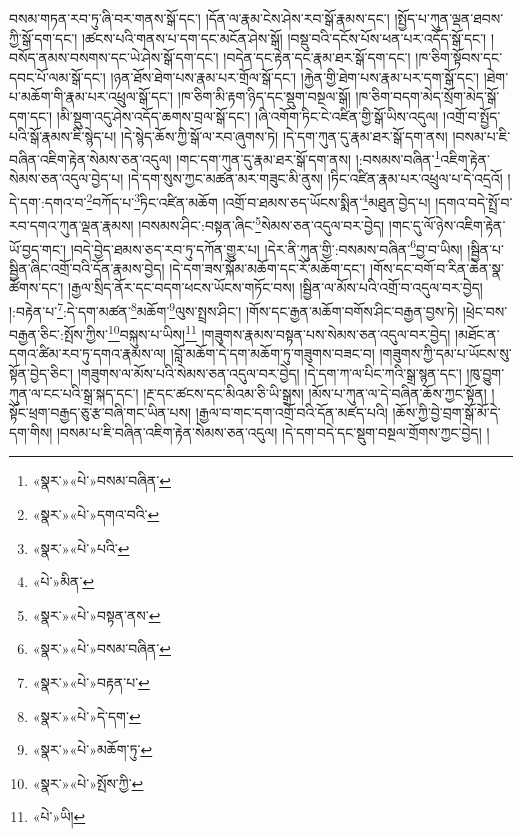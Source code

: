 བསམ་གཏན་རབ་ཏུ་ཞི་བར་གནས་སྒོ་དང་། །དོན་ལ་རྣམ་ངེས་ཤེས་རབ་སྒོ་རྣམས་དང་། །སྤྱོད་པ་ཀུན་ལྡན་ཐབས་ཀྱི་སྒོ་དག་དང་། །ཚངས་པའི་གནས་པ་དག་དང་མངོན་ཤེས་སྒོ། །བསྡུ་བའི་དངོས་པོས་ཕན་པར་འདོད་སྒོ་དང་། །བསོད་ནམས་བསགས་དང་ཡེ་ཤེས་སྒོ་དག་དང་། །བདེན་དང་རྟེན་དང་རྣམ་ཐར་སྒོ་དག་དང་། །ཁ་ཅིག་སྟོབས་དང་དབང་པོ་ལམ་སྒོ་དང་། །ཉན་ཐོས་ཐེག་པས་རྣམ་པར་གྲོལ་སྒོ་དང་། །རྐྱེན་གྱི་ཐེག་པས་རྣམ་པར་དག་སྒོ་དང་། །ཐེག་པ་མཆོག་གི་རྣམ་པར་འཕྲུལ་སྒོ་དང་། །ཁ་ཅིག་མི་རྟག་ཉིད་དང་སྡུག་བསྔལ་སྒོ། །ཁ་ཅིག་བདག་མེད་སྲོག་མེད་སྒོ་དག་དང་། །མི་སྡུག་འདུ་ཤེས་འདོད་ཆགས་བྲལ་སྒོ་དང་། །ཞི་འགོག་ཏིང་ངེ་འཛིན་གྱི་སྒོ་ཡིས་འདུལ། །འགྲོ་བ་སྤྱོད་པའི་སྒོ་རྣམས་ཇི་སྙེད་པ། །དེ་སྙེད་ཆོས་ཀྱི་སྒོ་ལ་རབ་ཞུགས་ཏེ། །དེ་དག་ཀུན་དུ་རྣམ་ཐར་སྒོ་དག་ནས། །བསམ་པ་ཇི་བཞིན་འཇིག་རྟེན་སེམས་ཅན་འདུལ། །གང་དག་ཀུན་དུ་རྣམ་ཐར་སྒོ་དག་ནས། །:བསམས་བཞིན་\footnote{«སྣར་»«པེ་»བསམ་བཞིན་}འཇིག་རྟེན་སེམས་ཅན་འདུལ་བྱེད་པ། །དེ་དག་སུས་ཀྱང་མཚན་མར་གཟུང་མི་ནུས། །ཏིང་འཛིན་རྣམ་པར་འཕྲུལ་པ་དེ་འདྲའོ། །དེ་དག་:དགའ་བ་\footnote{«སྣར་»«པེ་»དགའ་བའི་}བཀོད་པ་\footnote{«སྣར་»«པེ་»པའི་}ཏིང་འཛིན་མཆོག །འགྲོ་བ་ཐམས་ཅད་ཡོངས་སྨིན་\footnote{«པེ་»མིན་}མཐུན་བྱེད་པ། །དགའ་བདེ་སྤྲོ་བ་རབ་དགའ་ཀུན་ལྡན་རྣམས། །བསམས་ཤིང་:བསྟན་ཞིང་\footnote{«སྣར་»«པེ་»བསྟན་ནས་}སེམས་ཅན་འདུལ་བར་བྱེད། །གང་དུ་ལོ་ཉེས་འཇིག་རྟེན་ཡོ་བྱད་གང་། །བདེ་བྱེད་ཐམས་ཅད་རབ་ཏུ་དཀོན་གྱུར་པ། །དེར་ནི་ཀུན་གྱི་:བསམས་བཞིན་\footnote{«སྣར་»«པེ་»བསམ་བཞིན་}བྱ་བ་ཡིས། །སྦྱིན་པ་སྦྱིན་ཞིང་འགྲོ་བའི་དོན་རྣམས་བྱེད། །དེ་དག་ཟས་སྐོམ་མཆོག་དང་རོ་མཆོག་དང་། །གོས་དང་བགོ་བ་རིན་ཆེན་སྣ་ཚོགས་དང་། །རྒྱལ་སྲིད་ནོར་དང་བདག་ཕངས་ཡོངས་གཏོང་བས། །སྦྱིན་ལ་མོས་པའི་འགྲོ་བ་འདུལ་བར་བྱེད། །:བརྟེན་པ་\footnote{«སྣར་»«པེ་»བརྟན་པ་}:དེ་དག་མཚན་\footnote{«སྣར་»«པེ་»དེ་དག་}མཆོག་\footnote{«སྣར་»«པེ་»མཆོག་ཏུ་}ལུས་སྤྲས་ཤིང་། །གོས་དང་རྒྱན་མཆོག་བགོས་ཤིང་བརྒྱན་བྱས་ཏེ། །ཕྲེང་བས་བརྒྱན་ཅིང་:སྤོས་ཀྱིས་\footnote{«སྣར་»«པེ་»སྤོས་ཀྱི་}བསྐུས་པ་ཡིས།\footnote{«པེ་»ཡི།} །གཟུགས་རྣམས་བསྟན་པས་སེམས་ཅན་འདུལ་བར་བྱེད། །མཐོང་ན་དགའ་ཚིམ་རབ་ཏུ་དགའ་རྣམས་ལ། །བློ་མཆོག་དེ་དག་མཆོག་ཏུ་གཟུགས་བཟང་བ། །གཟུགས་ཀྱི་དམ་པ་ཡོངས་སུ་སྟོན་བྱེད་ཅིང་། །གཟུགས་ལ་མོས་པའི་སེམས་ཅན་འདུལ་བར་བྱེད། །དེ་དག་ཀ་ལ་པིང་ཀའི་སྒྲ་སྙན་དང་། །ཁུ་བྱུག་ཀུན་ལ་ངང་པའི་སྒྲ་སྐད་དང་། །རྔ་དང་ཚངས་དང་མིའམ་ཅི་ཡི་སྒྲས། །མོས་པ་ཀུན་ལ་དེ་བཞིན་ཆོས་ཀྱང་སྟོན། །སྟོང་ཕྲག་བརྒྱད་ཅུ་རྩ་བཞི་གང་ཡིན་པས། །རྒྱལ་བ་གང་དག་འགྲོ་བའི་དོན་མཛད་པའི། །ཆོས་ཀྱི་བྱེ་བྲག་སྒོ་མོ་དེ་དག་གིས། །བསམ་པ་ཇི་བཞིན་འཇིག་རྟེན་སེམས་ཅན་འདུལ། །དེ་དག་བདེ་དང་སྡུག་བསྔལ་གྲོགས་ཀྱང་བྱེད། །
